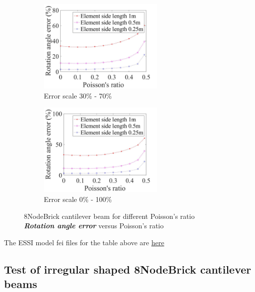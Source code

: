 \documentclass[fleqn,11pt,letter]{article}
\begin{document}
\begin{figure}[H]
  \begin{subfigure}{0.5\textwidth}
    \centering
    \includegraphics[width=6cm]{../Figure_files/8NodeBrick/error8brick_beam_different_poisson_ratio_angle_div.jpeg}
    \caption{Error scale 30\% - 70\%}
  \end{subfigure}
  \begin{subfigure}{0.5\textwidth}
    \centering
    \includegraphics[width=6cm]{../Figure_files/8NodeBrick/error8brick_beam_different_poisson_ratio_angle_div100.jpeg}
    \caption{Error scale 0\% - 100\%}
  \end{subfigure}
  \captionsetup{justification=centering,margin=3cm}
  \caption{8NodeBrick cantilever beam for different Poisson's ratio\\
      \emph{\textbf{Rotation angle error}}   versus   Poisson's ratio}
  \label{table angle error 8NodeBrick cantilever beam for different Poisson ratio}
\end{figure}



The ESSI model fei files for the table above are \href{https://github.com/yuan-energy/ESSI_Verification/blob/master/8NodeBrick/cantilever_different_Poisson/cantilever_different_Poisson.tar.gz?raw=true}{here}




\newpage
\subsection{Test of irregular shaped 8NodeBrick cantilever beams}
\end{document}
